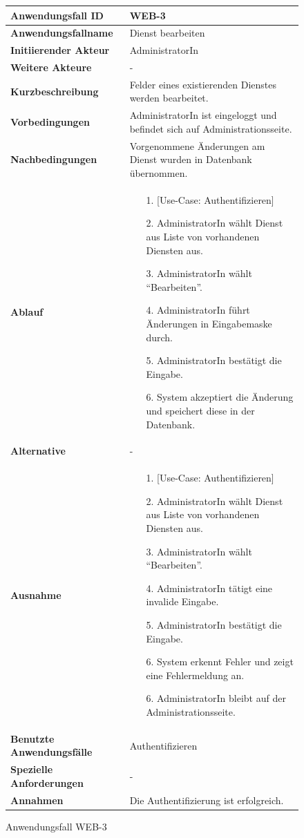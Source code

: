 \begin{figure}[h]
	\centering
	\begin{tabularx}{\textwidth}{ X | X }
		\textbf{Anwendungsfall ID} & WEB-3 \\ \hline
		\textbf{Anwendungsfallname} & Dienst bearbeiten \\ \hline
		\textbf{Initiierender Akteur} & AdministratorIn \\ \hline
		\textbf{Weitere Akteure} & - \\ \hline
		\textbf{Kurzbeschreibung} & Felder eines existierenden Dienstes werden bearbeitet. \\ \hline
		\textbf{Vorbedingungen} & AdministratorIn ist eingeloggt und befindet sich auf Administrationsseite. \\ \hline
		\textbf{Nachbedingungen} & Vorgenommene Änderungen am Dienst wurden in Datenbank übernommen. \\ \hline
		\textbf{Ablauf} &
		\begin{enumerate}
			\item [1.] [Use-Case: Authentifizieren]
			\item [2.] AdministratorIn wählt Dienst aus Liste von vorhandenen Diensten aus.
			\item [3.] AdministratorIn wählt ``Bearbeiten''.
			\item [4.] AdministratorIn führt Änderungen in Eingabemaske durch.
			\item [5.] AdministratorIn bestätigt die Eingabe.
			\item [6.] System akzeptiert die Änderung und speichert diese in der Datenbank.
		\end{enumerate} \\ \hline
		\textbf{Alternative} & - \\ \hline
		\textbf{Ausnahme} &
		\begin{enumerate}
			\item [1.] [Use-Case: Authentifizieren]
			\item [2.] AdministratorIn wählt Dienst aus Liste von vorhandenen Diensten aus.
			\item [3.] AdministratorIn wählt ``Bearbeiten''.
			\item [4.] AdministratorIn tätigt eine invalide Eingabe.
			\item [5.] AdministratorIn bestätigt die Eingabe.
			\item [6.] System erkennt Fehler und zeigt eine Fehlermeldung an.
			\item [6.] AdministratorIn bleibt auf der Administrationsseite.
		\end{enumerate}  \\ \hline
		\textbf{Benutzte Anwendungsfälle} & Authentifizieren \\ \hline
		\textbf{Spezielle Anforderungen} & - \\ \hline
		\textbf{Annahmen} & Die Authentifizierung ist erfolgreich.
	\end{tabularx}
	\caption{Anwendungsfall WEB-3}
	\label{fig:anwendungsfall-server-tabelle-web-3}
\end{figure}

